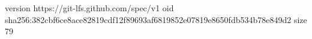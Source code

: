 version https://git-lfs.github.com/spec/v1
oid sha256:382cbf6ce8ace82819cdf12f89693af6819852e07819e8650fdb534b78e849d2
size 79
